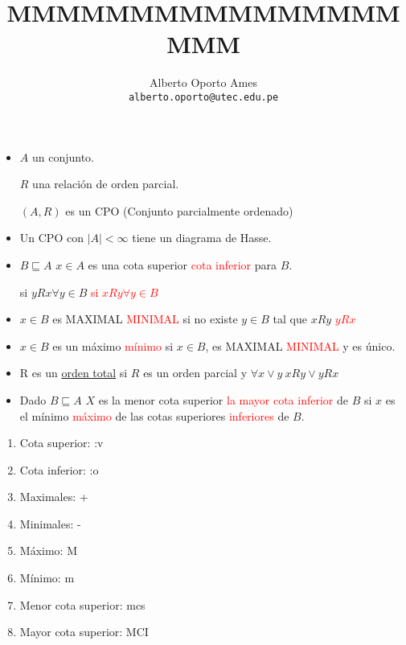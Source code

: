 \documentclass[12pt, twoside]{article}
\title{\textbf{MMMMMMMMMMMMMMMMMMM}}
\author{
		Alberto Oporto Ames\\
		\texttt{alberto.oporto@utec.edu.pe}\\
		}
\begin{document}
\maketitle
\thispagestyle{fancy}


\begin{itemize}
	\item $A$ un conjunto.

		$R$ una relación de orden parcial.

		$(A,R)$ es un CPO (Conjunto parcialmente ordenado)

	\item Un CPO con $|A| < \infty$ tiene un diagrama de Hasse.

	\item $B \sqsubseteq A$
		$x\in A$ es una cota superior \textcolor{red}{cota inferior} para $B$.

		si $yRx \forall y\in B$
		\textcolor{red}{si $xRy \forall y\in B$}

	\item $x\in B$ es MAXIMAL \textcolor{red}{MINIMAL} si no existe $y\in B$
		tal que $xRy$ \textcolor{red}{$yRx$}

	\item $x\in B$ es un máximo \textcolor{red}{mínimo} si $x\in B$, es MAXIMAL
		\textcolor{red}{MINIMAL} y es único.

	\item R es un \underline{orden total} si $R$ es un orden parcial y
		$\forall x \vee y\ xRy \vee yRx$

	\item Dado $B \sqsubseteq A$ $X$ es la menor cota superior
		\textcolor{red}{la mayor cota inferior} de $B$ si $x$
		es el mínimo \textcolor{red}{máximo} de las cotas superiores
		\textcolor{red}{inferiores } de $B$.
\end{itemize}
\begin{enumerate}
	\item Cota superior: :v
	\item Cota inferior: :o
	\item Maximales: +
	\item Minimales: -
	\item Máximo: M
	\item Mínimo: m
	\item Menor cota superior: mcs
	\item Mayor cota superior: MCI
\end{enumerate}
\end{document}

